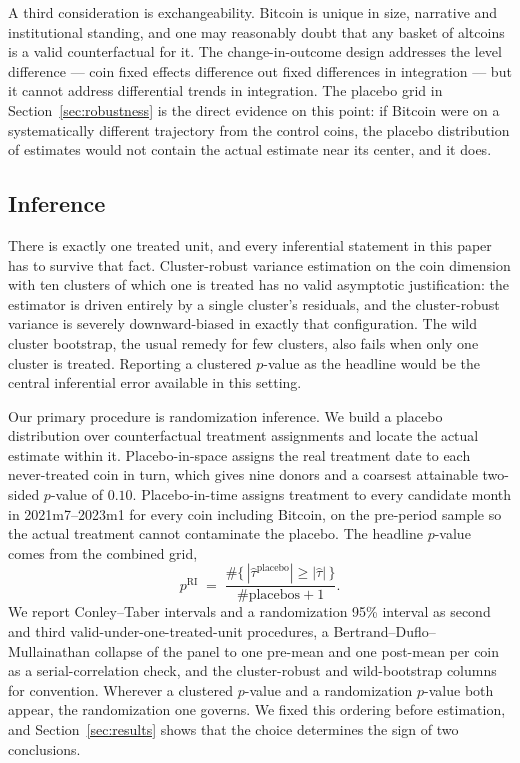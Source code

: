 \documentclass[12pt,a4paper]{article}
\begin{document}
A third consideration is exchangeability. Bitcoin is unique in size, narrative and institutional standing, and one may reasonably doubt that any basket of altcoins is a valid counterfactual for it. The change-in-outcome design addresses the level difference — coin fixed effects difference out fixed differences in integration — but it cannot address differential trends in integration. The placebo grid in Section~\ref{sec:robustness} is the direct evidence on this point: if Bitcoin were on a systematically different trajectory from the control coins, the placebo distribution of estimates would not contain the actual estimate near its center, and it does.

\subsection{Inference}

There is exactly one treated unit, and every inferential statement in this paper has to survive that fact. Cluster-robust variance estimation on the coin dimension with ten clusters of which one is treated has no valid asymptotic justification: the estimator is driven entirely by a single cluster's residuals, and the cluster-robust variance is severely downward-biased in exactly that configuration. The wild cluster bootstrap, the usual remedy for few clusters, also fails when only one cluster is treated. Reporting a clustered $p$-value as the headline would be the central inferential error available in this setting.

Our primary procedure is randomization inference. We build a placebo distribution over counterfactual treatment assignments and locate the actual estimate within it. Placebo-in-space assigns the real treatment date to each never-treated coin in turn, which gives nine donors and a coarsest attainable two-sided $p$-value of $0.10$. Placebo-in-time assigns treatment to every candidate month in 2021m7--2023m1 for every coin including Bitcoin, on the pre-period sample so the actual treatment cannot contaminate the placebo. The headline $p$-value comes from the combined grid,
\begin{equation}
p^{\mathrm{RI}} \;=\; \frac{\#\{\,|\hat\tau^{\mathrm{placebo}}| \ge |\hat\tau|\,\}}{\#\text{placebos} + 1}.
\label{eq:ri}
\end{equation}
We report Conley--Taber intervals and a randomization 95\% interval as second and third valid-under-one-treated-unit procedures, a Bertrand--Duflo--Mullainathan collapse of the panel to one pre-mean and one post-mean per coin as a serial-correlation check, and the cluster-robust and wild-bootstrap columns for convention. Wherever a clustered $p$-value and a randomization $p$-value both appear, the randomization one governs. We fixed this ordering before estimation, and Section~\ref{sec:results} shows that the choice determines the sign of two conclusions.
\end{document}
